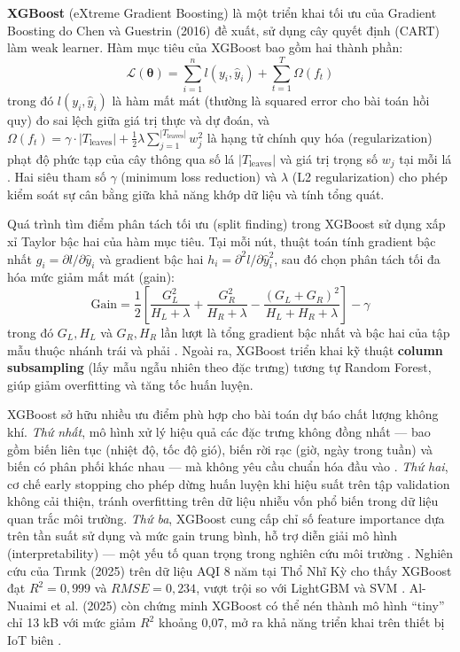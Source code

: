 \textbf{XGBoost} (eXtreme Gradient Boosting) là một triển khai tối ưu của Gradient Boosting do Chen và Guestrin (2016) đề xuất, sử dụng cây quyết định (CART) làm weak learner. Hàm mục tiêu của XGBoost bao gồm hai thành phần:
\begin{equation}
    \mathcal{L}(\boldsymbol{\theta}) = \sum_{i=1}^{n} l(y_i, \hat{y}_i) + \sum_{t=1}^{T} \Omega(f_t)
\end{equation}
trong đó $l(y_i, \hat{y}_i)$ là hàm mất mát (thường là squared error cho bài toán hồi quy) đo sai lệch giữa giá trị thực và dự đoán, và $\Omega(f_t) = \gamma \cdot |T_{\text{leaves}}| + \frac{1}{2}\lambda \sum_{j=1}^{|T_{\text{leaves}}|} w_j^2$ là hạng tử chính quy hóa (regularization) phạt độ phức tạp của cây thông qua số lá $|T_{\text{leaves}}|$ và giá trị trọng số $w_j$ tại mỗi lá \cite{Chen_2016}. Hai siêu tham số $\gamma$ (minimum loss reduction) và $\lambda$ (L2 regularization) cho phép kiểm soát sự cân bằng giữa khả năng khớp dữ liệu và tính tổng quát.

Quá trình tìm điểm phân tách tối ưu (split finding) trong XGBoost sử dụng xấp xỉ Taylor bậc hai của hàm mục tiêu. Tại mỗi nút, thuật toán tính gradient bậc nhất $g_i = \partial l / \partial \hat{y}_i$ và gradient bậc hai $h_i = \partial^2 l / \partial \hat{y}_i^2$, sau đó chọn phân tách tối đa hóa mức giảm mất mát (gain):
\begin{equation}
    \text{Gain} = \frac{1}{2}\left[\frac{G_L^2}{H_L + \lambda} + \frac{G_R^2}{H_R + \lambda} - \frac{(G_L + G_R)^2}{H_L + H_R + \lambda}\right] - \gamma
\end{equation}
trong đó $G_L, H_L$ và $G_R, H_R$ lần lượt là tổng gradient bậc nhất và bậc hai của tập mẫu thuộc nhánh trái và phải \cite{Chen_2016}. Ngoài ra, XGBoost triển khai kỹ thuật \textbf{column subsampling} (lấy mẫu ngẫu nhiên theo đặc trưng) tương tự Random Forest, giúp giảm overfitting và tăng tốc huấn luyện.

XGBoost sở hữu nhiều ưu điểm phù hợp cho bài toán dự báo chất lượng không khí. \textit{Thứ nhất}, mô hình xử lý hiệu quả các đặc trưng không đồng nhất — bao gồm biến liên tục (nhiệt độ, tốc độ gió), biến rời rạc (giờ, ngày trong tuần) và biến có phân phối khác nhau — mà không yêu cầu chuẩn hóa đầu vào \cite{Chen_2016}. \textit{Thứ hai}, cơ chế early stopping cho phép dừng huấn luyện khi hiệu suất trên tập validation không cải thiện, tránh overfitting trên dữ liệu nhiễu vốn phổ biến trong dữ liệu quan trắc môi trường. \textit{Thứ ba}, XGBoost cung cấp chỉ số feature importance dựa trên tần suất sử dụng và mức gain trung bình, hỗ trợ diễn giải mô hình (interpretability) — một yếu tố quan trọng trong nghiên cứu môi trường \cite{tirink2025aqi}. Nghiên cứu của Tırınk (2025) trên dữ liệu AQI 8 năm tại Thổ Nhĩ Kỳ cho thấy XGBoost đạt $R^2 = 0{,}999$ và $RMSE = 0{,}234$, vượt trội so với LightGBM và SVM \cite{tirink2025aqi}. Al-Nuaimi et al. (2025) còn chứng minh XGBoost có thể nén thành mô hình ``tiny'' chỉ 13 kB với mức giảm $R^2$ khoảng 0,07, mở ra khả năng triển khai trên thiết bị IoT biên \cite{alnuaimi2025lightweight}.


